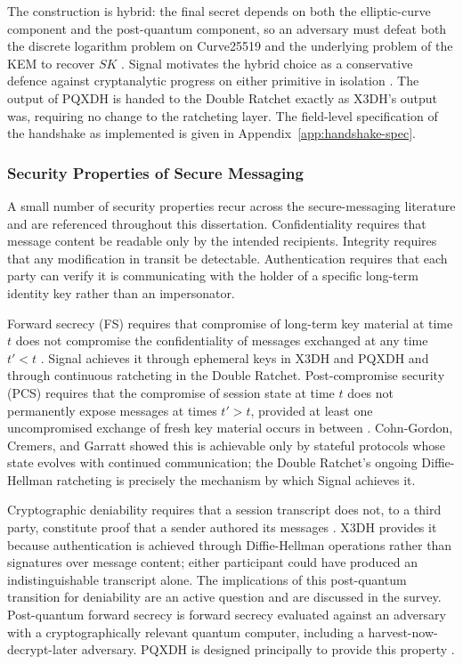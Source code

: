 The construction is hybrid: the final secret depends on both the elliptic-curve component and the post-quantum component, so an adversary must defeat both the discrete logarithm problem on Curve25519 and the underlying problem of the KEM to recover $SK$ \cite{kret_pqxdh_nodate}. Signal motivates the hybrid choice as a conservative defence against cryptanalytic progress on either primitive in isolation \cite{kret_quantum_nodate}. The output of PQXDH is handed to the Double Ratchet exactly as X3DH's output was, requiring no change to the ratcheting layer. The field-level specification of the handshake as implemented is given in Appendix~\ref{app:handshake-spec}.

\subsubsection{Security Properties of Secure Messaging}
\label{subsubsec:security-properties}

A small number of security properties recur across the secure-messaging literature and are referenced throughout this dissertation. Confidentiality requires that message content be readable only by the intended recipients. Integrity requires that any modification in transit be detectable. Authentication requires that each party can verify it is communicating with the holder of a specific long-term identity key rather than an impersonator.

Forward secrecy (FS) requires that compromise of long-term key material at time $t$ does not compromise the confidentiality of messages exchanged at any time $t' < t$ \cite{marlinspike_x3dh_nodate}. Signal achieves it through ephemeral keys in X3DH and PQXDH and through continuous ratcheting in the Double Ratchet. Post-compromise security (PCS) requires that the compromise of session state at time $t$ does not permanently expose messages at times $t' > t$, provided at least one uncompromised exchange of fresh key material occurs in between \cite{cohn-gordon_post-compromise_2016}. Cohn-Gordon, Cremers, and Garratt showed this is achievable only by stateful protocols whose state evolves with continued communication; the Double Ratchet's ongoing Diffie-Hellman ratcheting is precisely the mechanism by which Signal achieves it.

Cryptographic deniability requires that a session transcript does not, to a third party, constitute proof that a sender authored its messages \cite{marlinspike_x3dh_nodate}. X3DH provides it because authentication is achieved through Diffie-Hellman operations rather than signatures over message content; either participant could have produced an indistinguishable transcript alone. The implications of this post-quantum transition for deniability are an active question and are discussed in the survey. Post-quantum forward secrecy is forward secrecy evaluated against an adversary with a cryptographically relevant quantum computer, including a harvest-now-decrypt-later adversary. PQXDH is designed principally to provide this property \cite{kret_pqxdh_nodate, bhargavan_formal_2024}.

